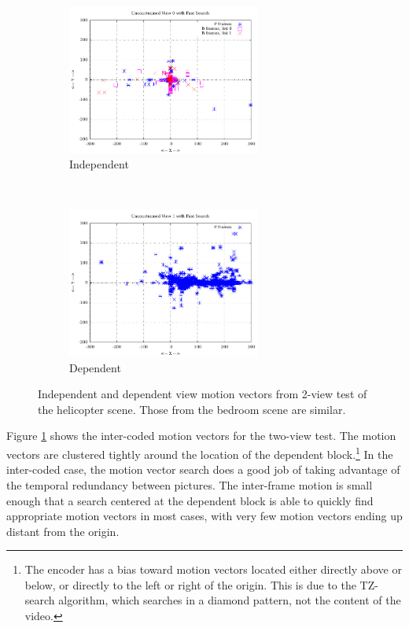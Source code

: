 \documentclass{sig-alternate-05-2015}
\begin{document}
\begin{figure}[h]
\centering
\begin{subfigure}{.5\textwidth}
\centering
\includegraphics[width=2.5in]{figures/helicopter-inter-mvs.pdf}
\caption{Independent}
\label{fig:inter-mvs}
\end{subfigure} \\
\begin{subfigure}{.5\textwidth}
\centering
\includegraphics[width=2.5in]{figures/helicopter-inter-view-mvs.pdf}
\caption{Dependent}
\label{fig:inter-view-mvs}
\end{subfigure}
\caption{
Independent and dependent view motion vectors from 2-view test of the helicopter
scene. Those from the bedroom scene are similar.
}
\label{fig:inter-and-inter-view-mvs}
\end{figure}

Figure \ref{fig:inter-mvs} shows the inter-coded motion vectors for the two-view
test. The motion vectors are clustered tightly around the location of the
dependent block.\footnote{The encoder has a bias toward motion vectors located
either directly above or below, or directly to the left or right of the origin.
This is due to the TZ-search algorithm, which searches in a diamond pattern, not
the content of the video.} In the inter-coded case, the motion vector search
does a good job of taking advantage of the temporal redundancy between
pictures. The inter-frame motion is small enough that a search centered at the
dependent block is able to quickly find appropriate motion vectors in most
cases, with very few motion vectors ending up distant from the origin.
\end{document}
